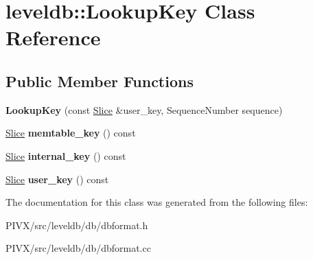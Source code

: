 \hypertarget{classleveldb_1_1_lookup_key}{}\section{leveldb\+:\+:Lookup\+Key Class Reference}
\label{classleveldb_1_1_lookup_key}
\subsection*{Public Member Functions}
\begin{DoxyCompactItemize}
\item 
\mbox{\label{classleveldb_1_1_lookup_key_acd09aa56607ced962e1b458d05d53472}} 
{\bfseries Lookup\+Key} (const \mbox{\hyperlink{classleveldb_1_1_slice}{Slice}} \&user\+\_\+key, Sequence\+Number sequence)
\item 
\mbox{\label{classleveldb_1_1_lookup_key_aa53ebf124713e32632a7aaaee359ac22}} 
\mbox{\hyperlink{classleveldb_1_1_slice}{Slice}} {\bfseries memtable\+\_\+key} () const
\item 
\mbox{\label{classleveldb_1_1_lookup_key_a3ba069ced6c871a1f420487e8ca99fc1}} 
\mbox{\hyperlink{classleveldb_1_1_slice}{Slice}} {\bfseries internal\+\_\+key} () const
\item 
\mbox{\label{classleveldb_1_1_lookup_key_a35812939729922656f6dc98c43216265}} 
\mbox{\hyperlink{classleveldb_1_1_slice}{Slice}} {\bfseries user\+\_\+key} () const
\end{DoxyCompactItemize}


The documentation for this class was generated from the following files\+:\begin{DoxyCompactItemize}
\item 
P\+I\+V\+X/src/leveldb/db/dbformat.\+h\item 
P\+I\+V\+X/src/leveldb/db/dbformat.\+cc\end{DoxyCompactItemize}
